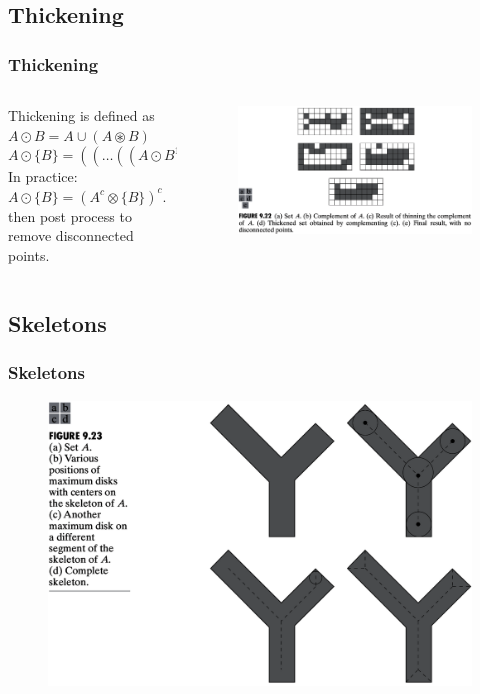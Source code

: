 \subsection{Thickening}

\begin{frame}
\frametitle{Thickening}
\begin{columns}
\begin{column}{.5\textwidth}
\scriptsize
Thickening is defined as
$A  \odot  B = A \cup (A \circledast B )$
$A  \odot  \{B\} = ((\ldots ((A  \odot  B^{1} )  \odot  B^{2} ) \ldots )  \odot  B^{n})$\\
In practice:\\
$A  \odot  \{B\} = (A^{c} \otimes \{B\})^{c}$.
then post process to remove disconnected points.
\normalsize
\end{column}
\begin{column}{.5\textwidth}
\begin{figure}[!h]
\includegraphics[width=\textwidth]{fig-9-22.png}
\end{figure}
\end{column}
\end{columns}
\end{frame}

\subsection{Skeletons}

\begin{frame}
\frametitle{Skeletons}
\begin{figure}[!h]
\includegraphics[width=.6\textwidth]{fig-9-23.png}
\end{figure}
\end{frame}

